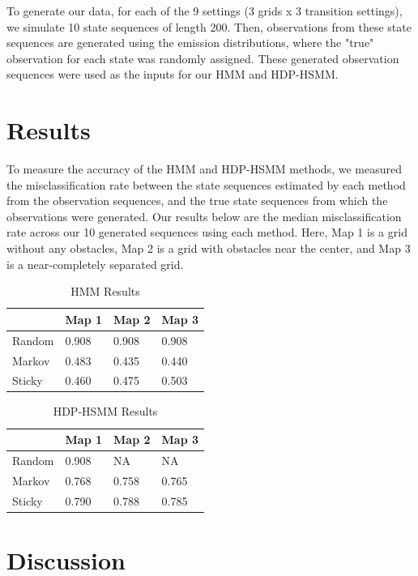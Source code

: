 \documentclass{article}
\begin{document}
To generate our data, for each of the 9 settings (3 grids x 3 transition settings), we simulate 10 state sequences of length 200. Then, observations from these state sequences are generated using the emission distributions, where the "true" observation for each state was randomly assigned. These generated observation sequences were used as the inputs for our HMM and HDP-HSMM.

\section{Results}

To measure the accuracy of the HMM and HDP-HSMM methods, we measured the misclassification rate between the state sequences estimated by each method from the observation sequences, and the true state sequences from which the observations were generated. Our results below are the median misclassification rate across our 10 generated sequences using each method. Here, Map 1 is a grid without any obstacles, Map 2 is a grid with obstacles near the center, and Map 3 is a near-completely separated grid.

\begin{table}[H]
	\centering
	\begin{tabular}{|l|l|l|l|}
	\hline
	& Map 1 & Map 2 & Map 3 \\
	\hline
	Random	& 0.908 & 0.908 & 0.908  \\
	\hline
	Markov & 0.483 & 0.435 & 0.440 \\
	\hline
	Sticky & 0.460 & 0.475& 0.503 \\
	\hline
	\end{tabular}
	\caption{HMM Results}
\end{table}

\begin{table}[H]
	\centering
	\begin{tabular}{|l|l|l|l|}
		\hline
		& Map 1 & Map 2 & Map 3 \\
		\hline
		Random	& 0.908 & NA &  NA \\
		\hline
		Markov & 0.768 & 0.758 & 0.765 \\
		\hline
		Sticky & 0.790 & 0.788 & 0.785 \\
		\hline
	\end{tabular}
	\caption{HDP-HSMM Results}
\end{table}

\section{Discussion}
\end{document}
